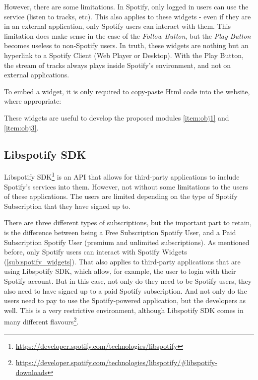       However, there are some limitations.
      In Spotify, only logged in users can use the service (listen to tracks, etc).
      This also applies to these widgets - even if they are in an external application, only Spotify users can interact with them.
      This limitation does make sense in the case of the \emph{Follow Button}, but the \emph{Play Button} becomes useless to non-Spotify users.
      In truth, these widgets are nothing but an hyperlink to a Spotify Client (Web Player or Desktop).
      With the Play Button, the stream of tracks always plays inside Spotify's environment, and not on external applications.

      To embed a widget, it is only required to copy-paste Html code into the website, where appropriate:

      

      These widgets are useful to develop the proposed modules \ref{item:obj1} and \ref{item:obj3}.


    \subsection{Libspotify SDK} %
    \label{sub:libspotify_sdk}

      Libspotify SDK\footnote{\url{https://developer.spotify.com/technologies/libspotify}} is an API that allows for third-party applications to include Spotify's services into them.
      However, not without some limitations to the users of these applications.
      The users are limited depending on the type of Spotify Subscription that they have signed up to.

      There are three different types of subscriptions, but the important part to retain, is the difference between being a Free Subscription Spotify User, and a Paid Subscription Spotify User (premium and unlimited subscriptions).
      As mentioned before, only Spotify users can interact with Spotify Widgets (\ref{sub:spotify_widgets}).
      That also applies to third-party applications that are using Libspotify SDK, which allow, for example, the user to login with their Spotify account.
      But in this case, not only do they need to be Spotify users, they also need to have signed up to a paid Spotify subscription.
      And not only do the users need to pay to use the Spotify-powered application, but the developers as well.
      This is a very restrictive environment, although Libspotify SDK comes in many different flavours\footnote{\url{https://developer.spotify.com/technologies/libspotify/\#libspotify-downloads}}.


